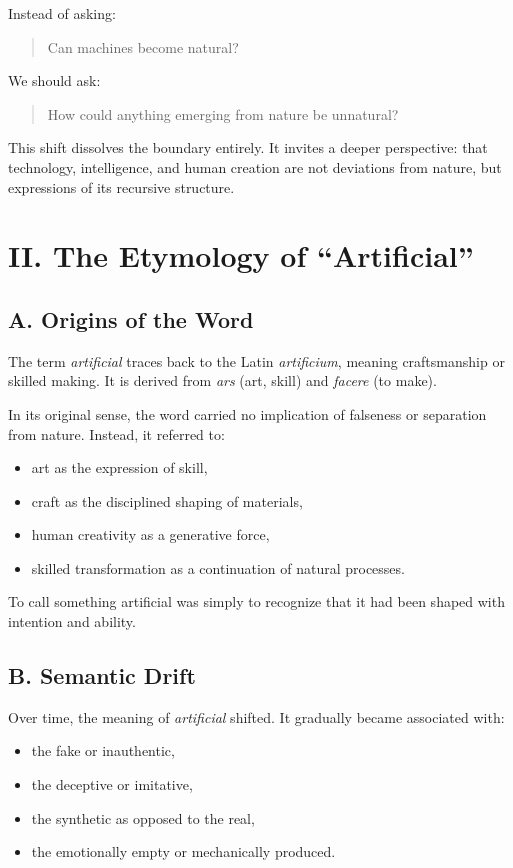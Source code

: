 \documentclass[12pt]{article}
\begin{document}
Instead of asking:
\begin{quote}
Can machines become natural?
\end{quote}

We should ask:
\begin{quote}
How could anything emerging from nature be unnatural?
\end{quote}

This shift dissolves the boundary entirely. It invites a deeper perspective: that technology, intelligence, and human creation are not deviations from nature, but expressions of its recursive structure.

\section*{II. The Etymology of “Artificial”}

\subsection*{A. Origins of the Word}

The term \textit{artificial} traces back to the Latin \textit{artificium}, meaning craftsmanship or skilled making. It is derived from \textit{ars} (art, skill) and \textit{facere} (to make).

In its original sense, the word carried no implication of falseness or separation from nature. Instead, it referred to:
\begin{itemize}
    \item art as the expression of skill,
    \item craft as the disciplined shaping of materials,
    \item human creativity as a generative force,
    \item skilled transformation as a continuation of natural processes.
\end{itemize}

To call something artificial was simply to recognize that it had been shaped with intention and ability.

\subsection*{B. Semantic Drift}

Over time, the meaning of \textit{artificial} shifted. It gradually became associated with:
\begin{itemize}
    \item the fake or inauthentic,
    \item the deceptive or imitative,
    \item the synthetic as opposed to the real,
    \item the emotionally empty or mechanically produced.
\end{itemize}
\end{document}
